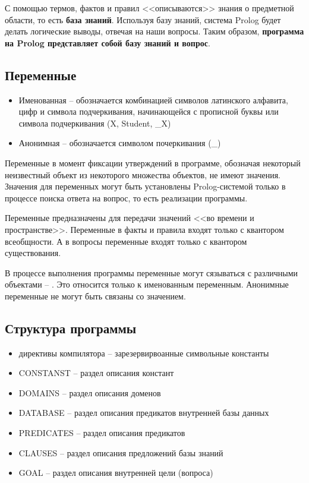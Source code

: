 С помощью термов, фактов и правил <<описываются>> знания о предметной области, то есть \textbf{база знаний}. Используя базу знаний, система Prolog будет делать логические выводы, отвечая на наши вопросы. Таким образом, \textbf{программа на Prolog представляет собой базу знаний и вопрос}.

\subsection{Переменные}

\begin{itemize}
    \item Именованная -- обозначается комбинацией символов латинского алфавита, цифр и символа подчеркивания, начинающейся с прописной буквы или символа подчеркивания (X, Student, \_X)
    \item Анонимная -- обозначается символом почеркивания (\_)
\end{itemize}

Переменные в момент фиксации утверждений в программе, обозначая некоторый неизвестный объект из некоторого множества объектов, не имеют значения. Значения для переменных могут быть установлены Prolog-системой только в процессе поиска ответа на вопрос, то есть реализации программы.

Переменные предназначены для передачи значений <<во времени и пространстве>>. Переменные в факты и правила входят только с квантором всеобщности. А в вопросы переменные входят только с квантором существования.

В процессе выполнения программы переменные могут сязываться с различными объектами -- . Это относится только к именованным переменным. Анонимные переменные не могут быть связаны со значением.

\subsection{Структура программы}

\begin{itemize}
    \item директивы компилятора -- зарезервирвоанные символьные константы
    \item CONSTANST -- раздел описания констант
    \item DOMAINS -- раздел описания доменов
    \item DATABASE -- раздел описания предикатов внутренней базы данных
    \item PREDICATES -- раздел описания предикатов
    \item CLAUSES -- раздел описания предложений базы знаний
    \item GOAL -- раздел описания внутренней цели (вопроса)
\end{itemize}

